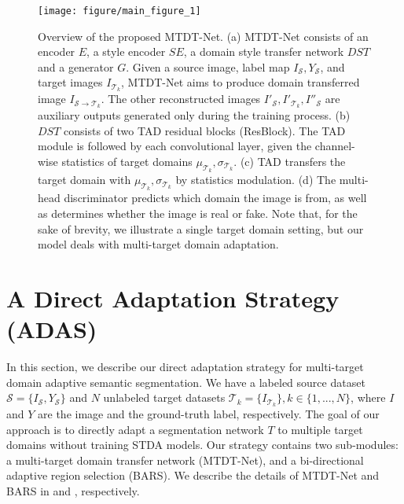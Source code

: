 \begin{figure*}[t] 
	\centering
    \texttt{[image: figure/main\_figure\_1]}
	\vspace{-2mm}
\caption{Overview of the proposed MTDT-Net.
	(a) MTDT-Net consists of an encoder $E$, a style encoder $SE$, a domain style transfer network $DST$ and a generator $G$. Given a source image, label map $I_\mathcal{S}, Y_\mathcal{S}$, and target images $I_{\mathcal{T}_k}$, MTDT-Net aims to produce domain transferred image $I_{\mathcal{S}\to \mathcal{T}_k}$.
	The other reconstructed images $I'_\mathcal{S}, I'_{\mathcal{T}_k}, I''_\mathcal{S}$ are auxiliary outputs generated only during the training process.
	(b) $DST$ consists of two TAD residual blocks (ResBlock). The TAD module is followed by each convolutional layer, given the channel-wise statistics of target domains $\mu_{\mathcal{T}_k}, \sigma_{\mathcal{T}_k}$.
	(c) TAD transfers the target domain with $\mu_{\mathcal{T}_k}, \sigma_{\mathcal{T}_k}$ by statistics modulation.
	(d) The multi-head discriminator predicts which domain the image is from, as well as determines whether the image is real or fake.
	Note that, for the sake of brevity, we illustrate a single target domain setting, but our model deals with multi-target domain adaptation.
	}
	\label{fig:overview}
	\vspace{-3mm}
\end{figure*}

\section{A Direct Adaptation Strategy (ADAS)}
\label{sec:method}

In this section, we describe our direct adaptation strategy for multi-target domain adaptive semantic segmentation.
We have a labeled source dataset $\mathcal{S}=\{I_\mathcal{S}, Y_\mathcal{S} \}$ and $N$ unlabeled target datasets $\mathcal{T}_k=\{I_{\mathcal{T}_k}\}, k\in \{1,...,N\}$, where $I$ and $Y$ are the image and the ground-truth label, respectively.
The goal of our approach is to directly adapt a segmentation network $T$ to multiple target domains without training STDA models.
Our strategy contains two sub-modules: a multi-target domain transfer network (MTDT-Net), and a bi-directional adaptive region selection (BARS).
We describe the details of MTDT-Net and BARS in  and , respectively.


